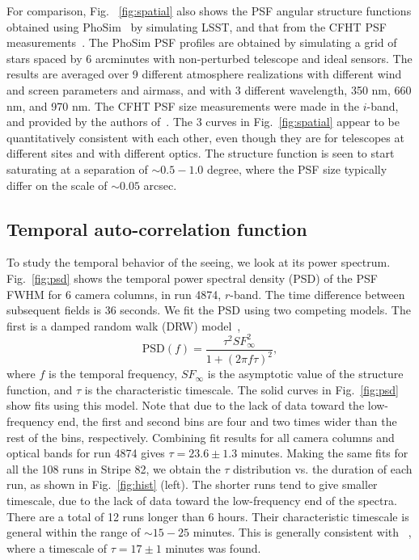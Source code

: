 For comparison, Fig. ~\ref{fig:spatial} also shows the PSF angular
structure functions obtained using PhoSim~\citep{phosim} by simulating LSST,
and that from the CFHT PSF measurements~\citep{heymans2012}.
The PhoSim PSF profiles are obtained by simulating a grid of stars
spaced by 6 arcminutes with non-perturbed telescope and ideal sensors.
The results are averaged over 9 different atmosphere realizations with
different wind and screen parameters and airmass, and with 3 different
wavelength, 350 nm, 660 nm, and 970 nm.
The CFHT PSF size measurements were made in the $i$-band, and provided
by the authors of~\cite{heymans2012}.
The 3 curves in Fig.~\ref{fig:spatial} appear to be quantitatively
consistent with each other, even though they are for telescopes at
different sites and with different optics.
The structure function is seen to start saturating at a separation of
$\sim 0.5 - 1.0$ degree, where the PSF size typically differ on the
scale of $\sim 0.05$ arcsec.

\subsection{Temporal auto-correlation function}

To study the temporal behavior of the seeing, we look at its
 power spectrum.
Fig.~\ref{fig:psd} shows the temporal power spectral density (PSD) of the
PSF FWHM for 6 camera columns, in run 4874, $r$-band.
The time difference between subsequent fields is 36 seconds.
We fit the PSD using two competing models.
The first is a damped random walk (DRW) model~\citep{zeljkoBook},
\begin{equation}
\textrm{PSD}(f) = \frac{\tau^2 SF^2_{\infty}}{1+(2\pi f \tau)^2},
\end{equation}
where $f$ is the temporal frequency, $SF_{\infty}$ is the asymptotic
value of the structure function, and $\tau$ is the
characteristic timescale.
The solid curves in Fig.~\ref{fig:psd} show fits using this model.
Note that due to the lack of data toward the low-frequency end, the
first and second bins are four and two times wider than the
rest of the bins, respectively.
Combining fit results for all camera columns and optical bands for run 4874
gives $\tau = 23.6 \pm 1.3$ minutes.
Making the same fits for all the 108 runs in Stripe 82, 
we obtain the $\tau$ distribution vs. the duration of each
run, as shown in Fig.~\ref{fig:hist} (left).
The shorter runs tend to give smaller timescale, due to the lack of
data toward the low-frequency end of the spectra.
There are a total of 12 runs longer than 6 hours.
Their characteristic timescale is general within the range of
$\sim15-25$ minutes.
This is generally consistent with ~\cite{Racine1996}, where a timescale of 
$\tau = 17 \pm 1$ minutes was found.

